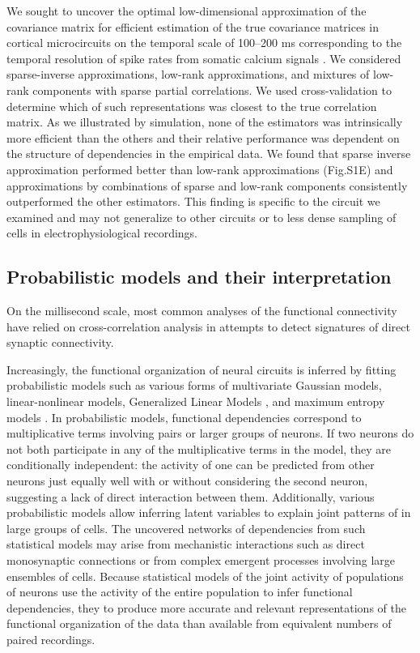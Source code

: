 \documentclass[10pt]{article}
\begin{document}
We sought to uncover the optimal low-dimensional approximation of the covariance matrix for efficient estimation of the true covariance matrices in cortical microcircuits on the temporal scale of 100--200 ms corresponding to the temporal resolution of spike rates from somatic calcium signals \cite{Cotton:2013}.  We considered sparse-inverse approximations, low-rank approximations, and mixtures of low-rank components with sparse partial correlations. We used cross-validation to determine which of such representations was closest to the true correlation matrix. As we illustrated by simulation, none of the estimators was intrinsically more efficient than the others and their relative performance was dependent on the structure of dependencies in the empirical data. We found that sparse inverse approximation performed better than low-rank approximations (Fig.\;S1\;E) and approximations by combinations of sparse and low-rank components consistently outperformed the other estimators. This finding is specific to the circuit we examined and may not generalize to other circuits or to less dense sampling of cells in electrophysiological recordings. 

\subsection*{Probabilistic models and their interpretation}
On the millisecond scale, most common analyses of the functional connectivity have relied on cross-correlation analysis in attempts to detect signatures of direct synaptic connectivity. 

Increasingly, the functional organization of neural circuits is inferred by fitting probabilistic models such as various forms of multivariate Gaussian models, linear-nonlinear models, Generalized Linear Models \cite{Pillow:2008}, and maximum entropy models \cite{Schneidman:2006,Tkacik:2006,Tang:2008,Shlens:2009}. In probabilistic models, functional dependencies correspond to multiplicative terms involving pairs or larger groups of neurons. If two neurons do not both participate in any of the multiplicative terms in the model, they are conditionally independent: the activity of one can be predicted from other neurons just equally well with or without considering the second neuron, suggesting a lack of direct interaction between them. Additionally, various probabilistic models allow inferring latent variables to explain joint patterns of in large groups of cells.  The uncovered networks of dependencies from such statistical models may arise from mechanistic interactions such as direct monosynaptic connections or from complex emergent processes involving large ensembles of cells. Because statistical models of the joint activity of populations of neurons use the activity of the entire population to infer functional dependencies, they to produce more accurate and relevant representations of the functional organization of the data than available from equivalent numbers of paired recordings.  
\end{document}
